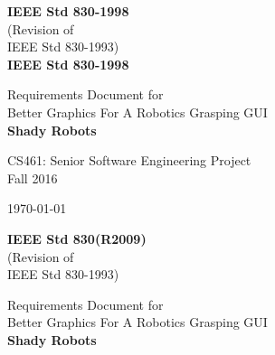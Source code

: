 \documentclass[10pt,journal,compsoc]{IEEEtran}
\begin{document}
\onecolumn

\begin{titlepage}

\begin{flushright}
\textbf{IEEE Std 830-1998} \\
(Revision of \\
IEEE Std 830-1993) \\
\vspace{5mm}
\textbf{IEEE Std 830-1998}
\end{flushright}

\vspace{25mm}

\begin{flushleft}
\begin{bfseries}
	\vskip2mm
	\Huge{Requirements Document for\\ Better Graphics For A Robotics Grasping GUI}\\
	\vspace{30mm}
	\textbf{\huge Shady Robots} \\
	
\end{bfseries}

\vspace{15mm}
\Large{CS461: Senior Software Engineering Project} \\
\Large{Fall 2016} \\

\vspace{10mm}

\today

\end{flushleft}

\newpage

\begin{flushright}
\textbf{IEEE Std 830(R2009)} \\
(Revision of \\
IEEE Std 830-1993) \\
\end{flushright}

\vspace{15mm}

\begin{flushleft}
\begin{bfseries}
	\vskip2mm
	\Huge{Requirements Document for\\ Better Graphics For A Robotics Grasping GUI}\\
	\vspace{30mm}
	\textbf{\huge Shady Robots} \\
	

\end{bfseries}
\end{flushleft}
\end{titlepage}
\end{document}
